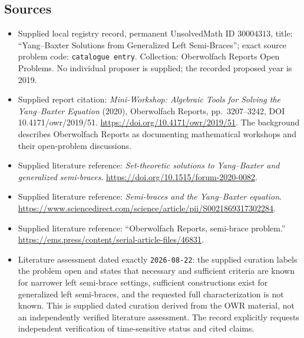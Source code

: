 \documentclass[11pt]{article}
\begin{document}
\subsection{Sources}
\begin{itemize}
\item Supplied local registry record, permanent UnsolvedMath ID \(30004313\), title: ``Yang--Baxter Solutions from Generalized Left Semi-Braces''; exact source problem code: \texttt{catalogue entry}. Collection: Oberwolfach Reports Open Problems. No individual proposer is supplied; the recorded proposed year is 2019.
\item Supplied report citation: \emph{Mini-Workshop: Algebraic Tools for Solving the Yang--Baxter Equation} (2020), Oberwolfach Reports, pp.~3207--3242, DOI 10.4171/owr/2019/51. \url{https://doi.org/10.4171/owr/2019/51}. The background describes Oberwolfach Reports as documenting mathematical workshops and their open-problem discussions.
\item Supplied literature reference: \emph{Set-theoretic solutions to Yang--Baxter and generalized semi-braces}. \url{https://doi.org/10.1515/forum-2020-0082}.
\item Supplied literature reference: \emph{Semi-braces and the Yang--Baxter equation}. \url{https://www.sciencedirect.com/science/article/pii/S0021869317302284}.
\item Supplied literature reference: ``Oberwolfach Reports, semi-brace problem.'' \url{https://ems.press/content/serial-article-files/46831}.
\item Literature assessment dated exactly \texttt{2026-08-22}: the supplied curation labels the problem open and states that necessary and sufficient criteria are known for narrower left semi-brace settings, sufficient constructions exist for generalized left semi-braces, and the requested full characterization is not known. This is supplied dated curation derived from the OWR material, not an independently verified literature assessment. The record explicitly requests independent verification of time-sensitive status and cited claims.
\end{itemize}
\end{document}
